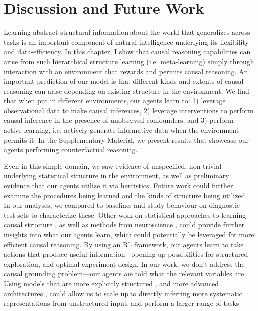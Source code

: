 \section{Discussion and Future Work}

Learning abstract structural information about the world that generalizes across tasks is an important component of natural intelligence underlying its flexibility and data-efficiency. In this chapter, I show that causal reasoning capabilities can arise from such hierarchical structure learning (i.e. meta-learning) simply through interaction with an environment that rewards and permits causal reasoning. An important prediction of our model is that different kinds and extents of causal reasoning can arise depending on existing structure in the environment. We find that when put in different environments, our agents learn to: 1) leverage observational data to make causal inferences, 2) leverage interventions to perform causal inference in the presence of unobserved confounders, and 3) perform active-learning, i.e. actively generate informative data when the environment permits it. In the Supplementary Material, we present results that showcase our agents performing counterfactual reasoning. 

Even in this simple domain, we saw evidence of unspecified, non-trivial underlying statistical structure in the environment, as well as preliminary evidence that our agents utilize it via heuristics. Future work could further examine the procedures being learned and the kinds of structure being utilized. In our analyses, we compared to baselines and study behaviour on diagnostic test-sets to characterize these. Other work on statistical approaches to learning causal structure \citep{bengio2019meta, janzing2009telling, hoyer2009nonlinear}, as well as methods from neuroscience \citep{wang2018}, could provide further insights into what our agents learn, which could potentially be leveraged for more efficient causal reasoning. By using an RL framework, our agents learn to take actions that produce useful information---opening up possibilities for structured exploration, and optimal experiment design. In our work, we don't address the causal grounding problem---our agents are told what the relevant variables are. Using models that are more explicitly structured \citep[e.g.][]{andreas2016neural,battaglia2018relational, ganin2018synthesizing}, and more advanced architectures \citep[e.g.][]{hester2017deep,hessel2018multi,espeholt2018impala}, could allow us to scale up to directly inferring more systematic representations from unstructured input, and perform a larger range of tasks.

